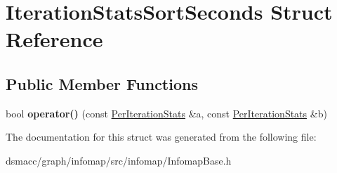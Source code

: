 \hypertarget{structIterationStatsSortSeconds}{}\section{Iteration\+Stats\+Sort\+Seconds Struct Reference}
\label{structIterationStatsSortSeconds}
\subsection*{Public Member Functions}
\begin{DoxyCompactItemize}
\item 
\mbox{\label{structIterationStatsSortSeconds_aeee73f1eaf5cadace4eb32623f1eebe4}} 
bool {\bfseries operator()} (const \mbox{\hyperlink{structPerIterationStats}{Per\+Iteration\+Stats}} \&a, const \mbox{\hyperlink{structPerIterationStats}{Per\+Iteration\+Stats}} \&b)
\end{DoxyCompactItemize}


The documentation for this struct was generated from the following file\+:\begin{DoxyCompactItemize}
\item 
dsmacc/graph/infomap/src/infomap/Infomap\+Base.\+h\end{DoxyCompactItemize}
